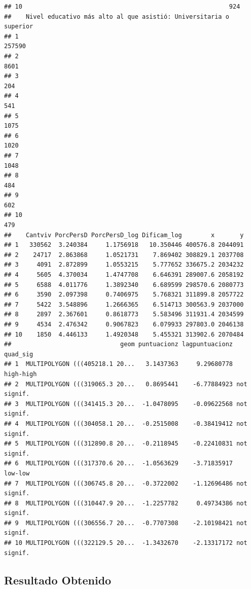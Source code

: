 \documentclass[11pt,]{article}
\begin{document}
\begin{verbatim}
## 10                                                         924
##    Nivel educativo más alto al que asistió: Universitaria o superior
## 1                                                             257590
## 2                                                               8601
## 3                                                                204
## 4                                                                541
## 5                                                               1075
## 6                                                               1020
## 7                                                               1048
## 8                                                                484
## 9                                                                602
## 10                                                               479
##    Cantviv PorcPersD PorcPersD_log Dificam_log        x       y
## 1   330562  3.240384     1.1756918   10.350446 400576.8 2044091
## 2    24717  2.863868     1.0521731    7.869402 308829.1 2037708
## 3     4091  2.872899     1.0553215    5.777652 336675.2 2034232
## 4     5605  4.370034     1.4747708    6.646391 289007.6 2058192
## 5     6588  4.011776     1.3892340    6.689599 298570.6 2080773
## 6     3590  2.097398     0.7406975    5.768321 311899.8 2057722
## 7     5422  3.548896     1.2666365    6.514713 300563.9 2037000
## 8     2897  2.367601     0.8618773    5.583496 311931.4 2034599
## 9     4534  2.476342     0.9067823    6.079933 297803.0 2046138
## 10    1850  4.446133     1.4920348    5.455321 313902.6 2070484
##                              geom puntuacionz lagpuntuacionz    quad_sig
## 1  MULTIPOLYGON (((405218.1 20...   3.1437363     9.29680778   high-high
## 2  MULTIPOLYGON (((319065.3 20...   0.8695441    -6.77884923 not signif.
## 3  MULTIPOLYGON (((341415.3 20...  -1.0478095    -0.09622568 not signif.
## 4  MULTIPOLYGON (((304058.1 20...  -0.2515008    -0.38419412 not signif.
## 5  MULTIPOLYGON (((312890.8 20...  -0.2118945    -0.22410831 not signif.
## 6  MULTIPOLYGON (((317370.6 20...  -1.0563629    -3.71835917     low-low
## 7  MULTIPOLYGON (((306745.8 20...  -0.3722002    -1.12696486 not signif.
## 8  MULTIPOLYGON (((310447.9 20...  -1.2257782     0.49734386 not signif.
## 9  MULTIPOLYGON (((306556.7 20...  -0.7707308    -2.10198421 not signif.
## 10 MULTIPOLYGON (((322129.5 20...  -1.3432670    -2.13317172 not signif.
\end{verbatim}

\subsection{Resultado Obtenido}\label{resultado-obtenido}
\end{document}
